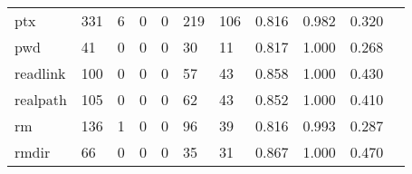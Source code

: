 \begin{longtable}{lp{1.20cm}p{1.20cm}p{1.20cm}p{1.20cm}p{1.20cm}p{1.20cm}p{1.20cm}p{1.20cm}p{1.20cm}p{1.20cm}}
ptx       &                                   331 &                                                  6 &                                                  0 &                                                  0 &                                                219 &                                                106 &                                         0.816 &                                              0.982 &                                              0.320 \\
pwd       &                                    41 &                                                  0 &                                                  0 &                                                  0 &                                                 30 &                                                 11 &                                         0.817 &                                              1.000 &                                              0.268 \\
readlink  &                                   100 &                                                  0 &                                                  0 &                                                  0 &                                                 57 &                                                 43 &                                         0.858 &                                              1.000 &                                              0.430 \\
realpath  &                                   105 &                                                  0 &                                                  0 &                                                  0 &                                                 62 &                                                 43 &                                         0.852 &                                              1.000 &                                              0.410 \\
rm        &                                   136 &                                                  1 &                                                  0 &                                                  0 &                                                 96 &                                                 39 &                                         0.816 &                                              0.993 &                                              0.287 \\
rmdir     &                                    66 &                                                  0 &                                                  0 &                                                  0 &                                                 35 &                                                 31 &                                         0.867 &                                              1.000 &                                              0.470 \\

\end{longtable}
